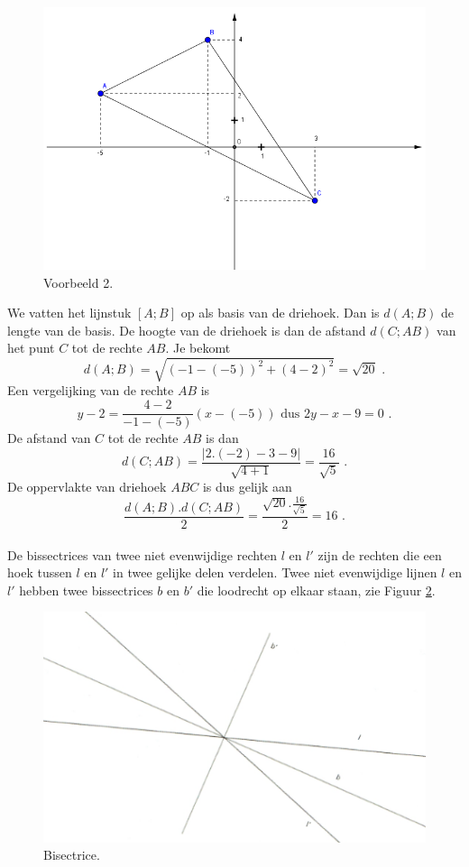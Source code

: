 \begin{figure}[h]
\begin{center}
\includegraphics[height=7 cm]{4_opp_inhoud_an_meetk/inputs/AMTekst6Fig1}
\caption{Voorbeeld 2.}
\label{fig4.2.14_fig1}
\end{center}
\end{figure} 

We vatten het lijnstuk $[A;B]$ op als basis van de driehoek.
Dan is $d(A;B)$ de lengte van de basis.
De hoogte van de driehoek is dan de afstand $d(C;AB)$ van het punt $C$ tot de rechte $AB$.
Je bekomt
\[
d(A;B)=\sqrt { (-1-(-5))^2+(4-2)^2}=\sqrt {20} \text { .}
\]
Een vergelijking van de rechte $AB$ is
\[
y-2=\frac {4-2}{-1-(-5)}(x-(-5)) \text { dus } 2y-x-9=0 \text { .}
\]
De afstand van $C$ tot de rechte $AB$ is dan
\[
d(C;AB)=\frac {\vert 2.(-2)-3-9 \vert}{\sqrt{4+1}}=\frac {16}{\sqrt {5}} \text { .}
\]
De oppervlakte van driehoek $ABC$ is dus gelijk aan
\[
\frac {d(A;B).d(C;AB)}{2}=\frac { \sqrt {20}.\frac {16}{\sqrt {5}}}{2}=16 \text { .}
\]\\

De bissectrices van twee niet evenwijdige rechten $l$ en $l'$ zijn de rechten die een hoek tussen $l$ en $l'$ in twee gelijke delen verdelen.
Twee niet evenwijdige lijnen $l$ en $l'$ hebben twee bissectrices $b$ en $b'$ die loodrecht op elkaar staan, zie Figuur \ref{fig4.2.14_fig2}.

\begin{figure}[h]
\begin{center}
\includegraphics[height=7 cm]{4_opp_inhoud_an_meetk/inputs/AMTekst6Fig2}
\caption{Bisectrice.}
\label{fig4.2.14_fig2}
\end{center}
\end{figure} 

